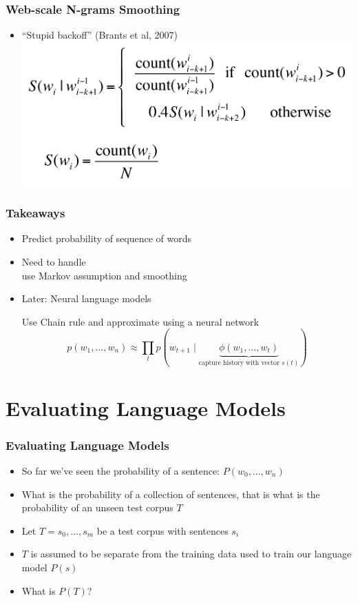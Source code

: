 \begin{frame}
\frametitle{Web-scale N-grams Smoothing}
\begin{itemize}[<+->]
\item ``Stupid backoff'' (Brants et al, 2007)
\centering
\includegraphics[scale=.25]{figures/lm/stupidbackoff}
\end{itemize}
\end{frame}


\begin{frame}
\frametitle{Takeaways}
\begin{itemize}[<+->]
\item Predict probability of sequence of words
\item Need to handle  \\ use Markov assumption and smoothing
\item Later: Neural language models
\begin{block}{Use Chain rule and approximate using a neural network}
\[ p(w_1, \ldots, w_n) \approx \prod_{t} p(w_{t+1} \mid \underbrace{\phi(w_1, \ldots, w_t)}_{\text{capture history with vector $s(t)$}}) \]
\end{block}
\end{itemize}
\end{frame}


\section{Evaluating Language Models}
\frame{\tableofcontents[currentsection]}

\begin{frame}
\frametitle{Evaluating Language Models}
\begin{itemize}[<+->]
\item So far we've seen the probability of a sentence: $P(w_0, \ldots, w_n)$
\item What is the probability of a collection of sentences, that is what is the probability of an unseen test corpus $T$
\item Let $T = s_0, \ldots, s_m$ be a test corpus with sentences $s_i$
\item $T$ is assumed to be separate from the training data used to train our language model $P(s)$
\item What is $P(T)$?
\end{itemize}
\end{frame}

